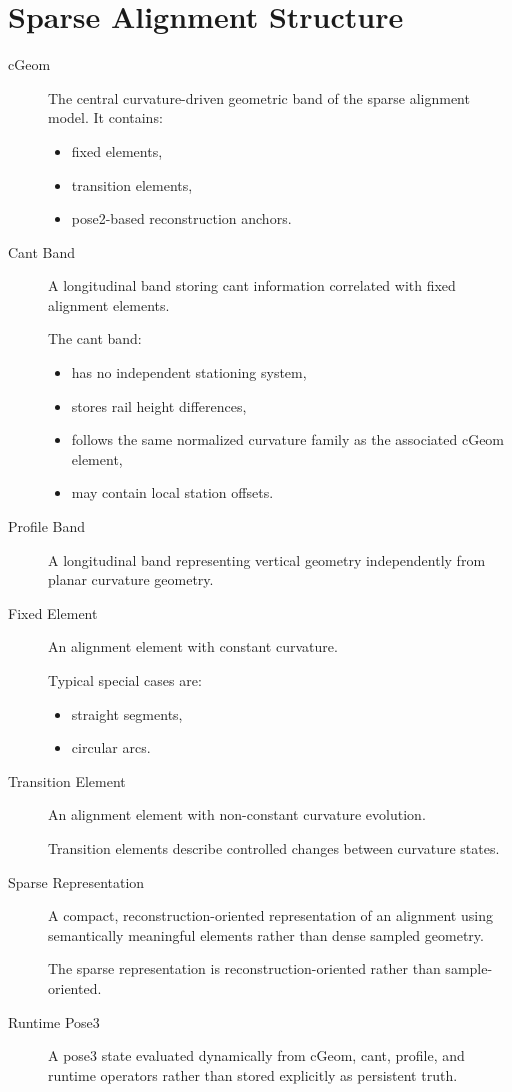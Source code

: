 \section*{Sparse Alignment Structure}

\begin{description}

\item[cGeom]
The central curvature-driven geometric band of the sparse alignment
model.
It contains:
\begin{itemize}
\item fixed elements,
\item transition elements,
\item pose2-based reconstruction anchors.
\end{itemize}

\item[Cant Band]
A longitudinal band storing cant information correlated with fixed
alignment elements.

The cant band:
\begin{itemize}
\item has no independent stationing system,
\item stores rail height differences,
\item follows the same normalized curvature family as the associated
cGeom element,
\item may contain local station offsets.
\end{itemize}

\item[Profile Band]
A longitudinal band representing vertical geometry independently from
planar curvature geometry.

\item[Fixed Element]
An alignment element with constant curvature.

Typical special cases are:
\begin{itemize}
\item straight segments,
\item circular arcs.
\end{itemize}

\item[Transition Element]
An alignment element with non-constant curvature evolution.

Transition elements describe controlled changes between curvature states.

\item[Sparse Representation]
A compact, reconstruction-oriented representation of an alignment using
semantically meaningful elements rather than dense sampled geometry.

The sparse representation is reconstruction-oriented rather than
sample-oriented.

\item[Runtime Pose3]
A pose3 state evaluated dynamically from cGeom, cant, profile, and
runtime operators rather than stored explicitly as persistent truth.

\end{description}

